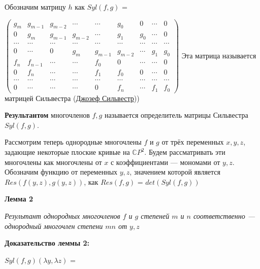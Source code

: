 \documentclass[a4paper, 12pt]{article}
\begin{document}
\smallskip
Обозначим матрицу $h$ как $Syl(f,g)$ =

\smallskip
$\begin{pmatrix}
g_m & g_{m-1} & g_{m-2} & \cdots & \cdots & g_0 & 0 & \cdots & 0 \\
0 & g_m & g_{m-1} & g_{m-2} & \cdots & g_1 & g_0 & \cdots & 0 \\
\cdots & \cdots & \cdots & \cdots & \cdots & \cdots & \cdots & \cdots & \cdots \\
0 & \cdots & 0 & g_m & g_{m-1} & g_{m-2} & \cdots & g_1 & g_0 \\
f_n & f_{n-1} & \cdots & \cdots & f_0 & 0 & \cdots & \cdots & 0 \\
0 & f_n & \cdots & \cdots & f_1 & f_0 & 0 & \cdots & 0 \\
\cdots & \cdots & \cdots & \cdots & \cdots & \cdots & \cdots & \cdots & \cdots \\
0 & \cdots & \cdots & \cdots & 0 & f_n & \cdots & f_1 & f_0
\end{pmatrix}$
\newline
Эта матрица называется матрицей Сильвестра (\href{https://ru.wikipedia.org/wiki/%D0%A1%D0%B8%D0%BB%D1%8C%D0%B2%D0%B5%D1%81%D1%82%D1%80,_%D0%94%D0%B6%D0%B5%D0%B9%D0%BC%D1%81_%D0%94%D0%B6%D0%BE%D0%B7%D0%B5%D1%84}{Джозеф Сильвестр}))
\bigskip

\textbf{Результантом} многочленов $f,g$ называется определитель матрицы Сильвестра $Syl(f,g)$.\newline

Рассмотрим теперь однородные многочлены $f$ и $g$ от трёх переменных $x,y,z$, задающие некоторые плоские кривые на $\mathbb{C}P^2$.\newline
Будем рассматривать эти многочлены как многочлены от $x$ с коэффициентами --- мономами от $y,z$.\newline
Обозначим функцию от переменных $y,z$, значением которой является\newline $Res(f(y,z),g(y,z))$, как $Res(f,g)$ = $det(Syl(f,g))$\newline

\smallskip
\textbf{Лемма 2}

\textit{Результант однородных многочленов $f$ и $g$ степеней $m$ и $n$ соответственно --- однородный многочлен степени $mn$ от $y,z$}

\textbf{Доказательство леммы 2:}\newline

$Syl(f,g)(\lambda y,\lambda z)$ =
\end{document}
